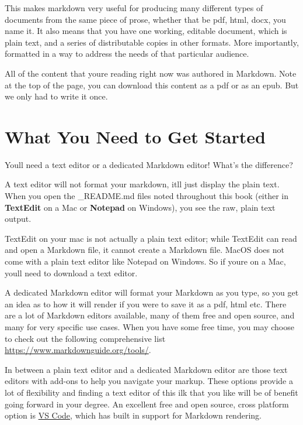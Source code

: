 \documentclass[
]{book}
\begin{document}
This makes markdown very useful for producing many different types of documents from the same piece of prose, whether that be pdf, html, docx, you name it. It also means that you have one working, editable document, which is plain text, and a series of distributable copies in other formats. More importantly, formatted in a way to address the needs of that particular audience.

All of the content that you\textquotesingle re reading right now was authored in Markdown. Note at the top of the page, you can download this content as a pdf or as an epub. But we only had to write it once.

\hypertarget{what-you-need-to-get-started}{%
\section{What You Need to Get Started}\label{what-you-need-to-get-started}}

You\textquotesingle ll need a text editor or a dedicated Markdown editor! What's the difference?

A text editor will not format your markdown, it\textquotesingle ll just display the plain text. When you open the \_README.md files noted throughout this book (either in \textbf{TextEdit} on a Mac or \textbf{Notepad} on Windows), you see the raw, plain text output.

TextEdit on your mac is not actually a plain text editor; while TextEdit can read and open a Markdown file, it cannot create a Markdown file. MacOS does not come with a plain text editor like Notepad on Windows. So if you\textquotesingle re on a Mac, you\textquotesingle ll need to download a text editor.

A dedicated Markdown editor will format your Markdown as you type, so you get an idea as to how it will render if you were to save it as a pdf, html etc. There are a lot of Markdown editors available, many of them free and open source, and many for very specific use cases. When you have some free time, you may choose to check out the following comprehensive list \url{https://www.markdownguide.org/tools/}.

In between a plain text editor and a dedicated Markdown editor are those text editors with add-ons to help you navigate your markup. These options provide a lot of flexibility and finding a text editor of this ilk that you like will be of benefit going forward in your degree. An excellent free and open source, cross platform option is \href{https://code.visualstudio.com/}{VS Code}, which has built in support for Markdown rendering.
\end{document}
